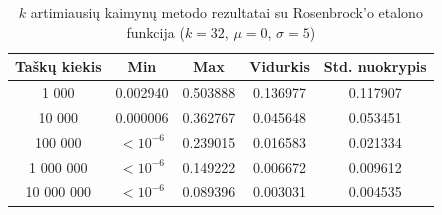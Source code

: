\begin{table}[H]
    \centering
    \begin{tabular}{|c|c|c|c|c|}
        \hline
        \textbf{Taškų kiekis} & \textbf{Min} & \textbf{Max} & \textbf{Vidurkis} & \textbf{Std. nuokrypis} \\ \hline
        1 000        & 0.002940 & 0.503888 & 0.136977 & 0.117907 \\ \hline
        10 000       & 0.000006 & 0.362767 & 0.045648 & 0.053451 \\ \hline
        100 000      & $<10^{-6}$ & 0.239015 & 0.016583 & 0.021334 \\ \hline
        1 000 000    & $<10^{-6}$ & 0.149222 & 0.006672 & 0.009612 \\ \hline
        10 000 000   & $<10^{-6}$ & 0.089396 & 0.003031 & 0.004535 \\ \hline
    \end{tabular}
    \caption{$k$ artimiausių kaimynų metodo rezultatai su Rosenbrock'o etalono funkcija ($k = 32$, $\mu = 0$, $\sigma = 5$)}
\end{table}